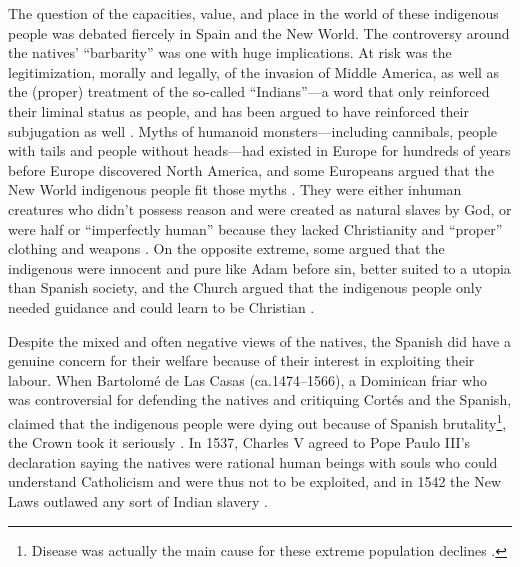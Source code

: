 The question of the capacities, value, and place in the world of these indigenous people was debated fiercely in Spain and the New World. The controversy around the natives’ “barbarity” was one with huge implications. At risk was the legitimization, morally and legally, of the invasion of Middle America, as well as the (proper) treatment of the so-called “Indians”—a word that only reinforced their liminal status as people, and has been argued to have reinforced their subjugation as well \parencites[29-30]{Swarthout2004}{Bonfil1977}. 
Myths of humanoid monsters—including cannibals, people with tails and people without heads—had existed in Europe for hundreds of years before Europe discovered North America, and some Europeans argued that the New World indigenous people fit those myths \parencite[103]{Restall2003}. 
They were either inhuman creatures who didn’t possess reason and were created as natural slaves by God, or were half or “imperfectly human” \parencite[150]{Todorov1984} 
because they lacked Christianity and “proper” clothing and weapons \parencite[103]{Restall2003}. 
On the opposite extreme, some argued that the indigenous were innocent and pure like Adam before sin, better suited to a utopia than Spanish society, and the Church argued that the indigenous people only needed guidance and could learn to be Christian \parencites[104]{Restall2003}[31]{Swarthout2004}.

Despite the mixed and often negative views of the natives, the Spanish did have a genuine concern for their welfare because of their interest in exploiting their labour. 
When Bartolomé de Las Casas (ca.1474–1566), a Dominican friar who was controversial for defending the natives and critiquing Cortés and the Spanish, claimed that the indigenous people were dying out because of Spanish brutality\footnote{Disease was actually the main cause for these extreme population declines \parencite[128]{Restall2003}.}, 
the Crown took it seriously \parencite[129]{Restall2003}. 
In 1537, Charles V agreed to Pope Paulo III’s declaration saying the natives were rational human beings with souls who could understand Catholicism and were thus not to be exploited, and in 1542 the New Laws outlawed any sort of Indian slavery \parencite[32]{Swarthout2004}.

